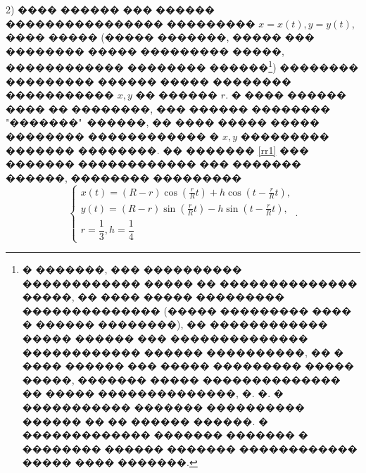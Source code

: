 \documentclass[a4paper]{article}
\begin{document}
  2) ���� ������ ��� ������ ���������������� ��������� $x=x(t),y=y(t)$,
        ���� ����� (����� �������, ����� ��� �������� ����� ��������� �����,
        ������������ �������� ������\footnote{� �������, ��� ���������� ������������ ����� �� �������������� �����, �� ���� ����� ��������� �������������� (����� ��������� ���� � ������ ��������), �� ������������ ����� ������ ��� �������������� ������������ ������ ����������, �� � ���� ������ ��� ����� ��������� ����� �����, ������� ����� �������������� �� ����� ��������������, �. �. � ����������� ������� ���������� ������ �� �� ������ ������. � ������������� ������� ������� � �������� ������ ������� ������������ ����� ���� �������.}) �������� ��������� ������ ����� �������� ����������� $x,y$ �� ������ $r$.
        � ���� ������ ���� �� ��������, ��� ������ �������� "�������"\ ������, �� ���� ����� ����� �������� ������������ � $x,y$ ��������� ������� ��������.
        �� ������� \ref{rr1} ��� ������� ������������ ��� ������� ������, �������� ���������
        \[
          \begin{cases}
            x(t)=(R-r)\cos\left(\frac{r}{R}t\right)+h \cos \left(t-\frac{r}{R}t\right), \\
            y(t)=(R-r)\sin\left(\frac{r}{R}t\right)-h \sin \left(t-\frac{r}{R}t\right), \\
            r=\dfrac{1}{3}, h=\dfrac{1}{4}
          \end{cases}.
        \]
\end{document}
